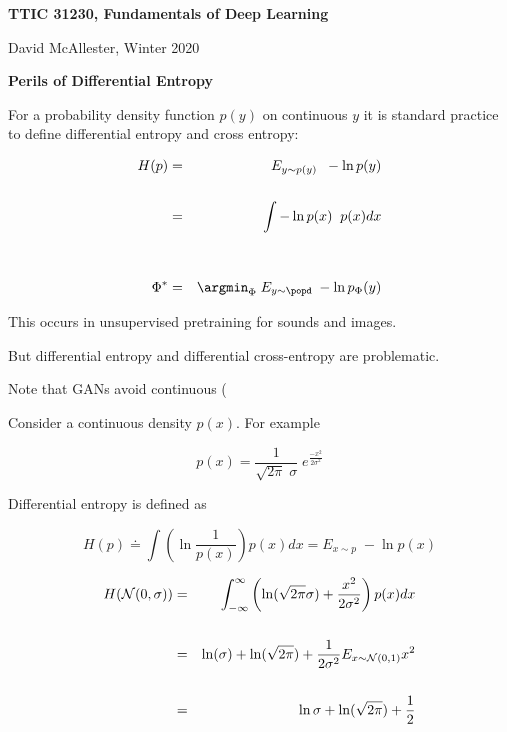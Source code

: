 




{\Huge

  \centerline{\bf TTIC 31230, Fundamentals of Deep Learning}
  \bigskip
  \centerline{David McAllester, Winter 2020}
  \vfill
  \centerline{\bf Perils of Differential Entropy}
  \vfill
\vfill
\vfill


For a probability density function $p(y)$ on continuous $y$ it is standard practice to define differential entropy and cross entropy:

\vfill
\begin{eqnarray*}
H(p) & = & E_{y \sim p(y)}\;\;-\ln p(y) \\
\\
& = & \int - \ln p(x)\;\; p(x) dx \\
\\
\\
\Phi^* & = & \argmin_\Phi \;E_{y \sim \popd}\;-\ln p_\Phi(y)
\end{eqnarray*}

\slide{}
\vfill
This occurs in unsupervised pretraining for sounds and images.

\vfill
But differential entropy and differential cross-entropy are problematic.

\vfill
Note that GANs avoid continuous (



Consider a continuous density $p(x)$.  For example

\vfill
$$p(x) = \frac{1}{\sqrt{2\pi}\; \sigma}\; e^{\frac{-x^2}{2\sigma^2}}$$

\vfill
Differential entropy is defined as

\vfill
$$H(p) \doteq \int \left(\ln \frac{1}{p(x)}\right) p(x) dx = E_{x \sim p}\;-\ln p(x)$$


\begin{eqnarray*}
  H({\cal N}(0,\sigma)) & = &  \int_{-\infty}^\infty \left( \ln(\sqrt{2\pi} \sigma) + \frac{x^2}{2\sigma^2}\right) p(x) dx \\
  \\
  & = & \ln(\sigma) + \ln(\sqrt{2\pi}) + \frac{1}{2\sigma^2}E_{x \sim {\cal N}(0,1)} x^2 \\
  \\
  & = & \ln \sigma + \ln(\sqrt{2\pi}) + \frac{1}{2}  
\end{eqnarray*}

}

